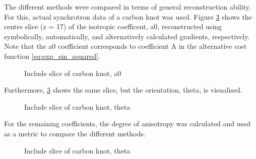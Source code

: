 The different methods were compared in terms of general reconstruction ability. For this, actual synchrotron data of a carbon knot was used.
Figure \ref{} shows the centre slice (z = 17) of the isotropic coefficent, a0, reconstructed using symbolically, automatically, and alternatively calculated gradients, respectively.
Note that the a0 coefficient corresponds to coefficient A in the alternative cost function \eqref{eq:exp_sin_squared}.
\begin{figure}[h!]
    \centering
    \caption{  Include slice of carbon knot, a0 }
    \label{}
\end{figure}
Furthermore, \ref{} shows the same slice, but the orientation, theta, is visualised.
\begin{figure}[h!]
    \centering
    \caption{  Include slice of carbon knot, theta }
    \label{}
\end{figure}

For the remaining coefficients, the degree of anisotropy was calculated and used as a metric to compare the different methods.

\begin{figure}[h!]
    \centering
    \caption{  Include slice of carbon knot, theta }
    \label{}
\end{figure}


